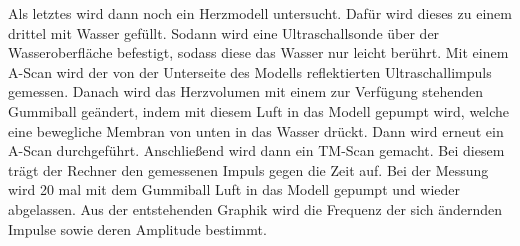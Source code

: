 Als letztes wird dann noch ein Herzmodell untersucht.
Dafür wird dieses zu einem drittel mit Wasser gefüllt. Sodann wird eine Ultraschallsonde
über der Wasseroberfläche befestigt, sodass diese das Wasser nur leicht berührt. Mit einem A-Scan wird der
von der Unterseite des Modells reflektierten Ultraschallimpuls gemessen. Danach wird das Herzvolumen mit einem
zur Verfügung stehenden Gummiball geändert, indem mit diesem Luft in das Modell gepumpt wird, welche eine bewegliche
Membran von unten in das Wasser drückt. Dann wird erneut ein A-Scan durchgeführt.
Anschließend wird dann ein TM-Scan gemacht. Bei diesem trägt der Rechner den gemessenen Impuls gegen die Zeit auf.
Bei der Messung wird 20 mal mit dem Gummiball Luft in das Modell gepumpt und wieder abgelassen. Aus der entstehenden
Graphik wird die Frequenz der sich ändernden Impulse sowie deren Amplitude bestimmt.
